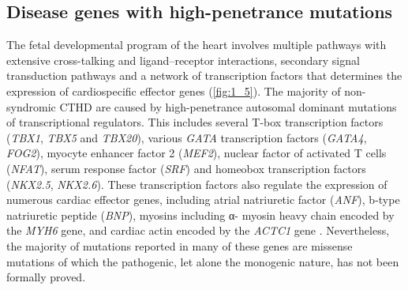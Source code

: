 \begin{refsection}
\subsection{Disease genes with high-penetrance mutations}

The fetal developmental program of the heart involves multiple pathways with extensive cross-talking and ligand–receptor interactions, secondary signal transduction pathways and a network of transcription factors that determines the expression of cardiospecific effector genes (\cref{fig:1_5}).
The majority of non-syndromic CTHD are caused by high-penetrance autosomal dominant mutations of transcriptional regulators. This includes several T-box transcription factors (\textit{TBX1}, \textit{TBX5} and \textit{TBX20}), various \textit{GATA} transcription factors (\textit{GATA4}, \textit{FOG2}), myocyte enhancer factor 2 (\textit{MEF2}), nuclear factor of activated T cells (\textit{NFAT}), serum response factor (\textit{SRF}) and homeobox transcription factors (\textit{NKX2.5}, \textit{NKX2.6}). These transcription factors also regulate the expression of numerous cardiac effector genes, including atrial natriuretic factor (\textit{ANF}), b-type natriuretic peptide (\textit{BNP}), myosins including α- myosin heavy chain  encoded by the \textit{MYH6} gene, and cardiac actin encoded by the \textit{ACTC1} gene \cite{wessels2010genetic}. Nevertheless, the majority of mutations reported in many of these genes are missense mutations of which the pathogenic, let alone the monogenic nature, has not been formally proved.


\end{refsection}
